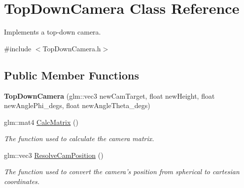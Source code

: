\hypertarget{class_top_down_camera}{\section{Top\-Down\-Camera Class Reference}
\label{class_top_down_camera}
}


Implements a top-\/down camera.  




{\ttfamily \#include $<$Top\-Down\-Camera.\-h$>$}

\subsection*{Public Member Functions}
\begin{DoxyCompactItemize}
\item 
\hypertarget{class_top_down_camera_ad898cfb0a3d0a251a48df3e25d87045f}{{\bfseries Top\-Down\-Camera} (glm\-::vec3 new\-Cam\-Target, float new\-Height, float new\-Angle\-Phi\-\_\-degs, float new\-Angle\-Theta\-\_\-degs)}\label{class_top_down_camera_ad898cfb0a3d0a251a48df3e25d87045f}

\item 
glm\-::mat4 \hyperlink{class_top_down_camera_a576b6335f1442eec4b75724e80b6a45a}{Calc\-Matrix} ()
\begin{DoxyCompactList}\small\item\em The function used to calculate the camera matrix. \end{DoxyCompactList}\item 
glm\-::vec3 \hyperlink{class_top_down_camera_a96829fb433ccf1d3857e6681477bc615}{Resolve\-Cam\-Position} ()
\begin{DoxyCompactList}\small\item\em The function used to convert the camera's position from spherical to cartesian coordinates. \end{DoxyCompactList}\end{DoxyCompactItemize}
